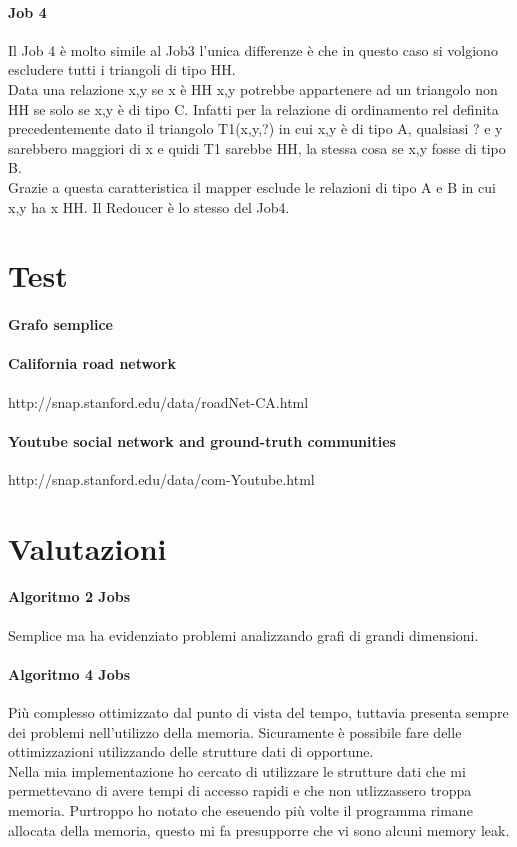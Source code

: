 \documentclass[paper=a4, fontsize=11pt]{scrartcl}	%
\numberwithin{equation}{section}															%
\numberwithin{figure}{section}																%
\numberwithin{table}{section}																%
\begin{document}
\paragraph{Job 4}
Il Job 4 è molto simile al Job3 l'unica differenze è che in questo caso si volgiono escludere tutti i triangoli di tipo HH.\\
Data una relazione x,y se x è HH x,y potrebbe appartenere ad un triangolo non HH se solo se x,y è di tipo C. Infatti per la relazione di ordinamento rel definita precedentemente dato il triangolo T1(x,y,?) in cui x,y è di tipo A, qualsiasi ? e y sarebbero maggiori di x e quidi T1 sarebbe HH, la stessa cosa se x,y fosse di tipo B.\\
Grazie a questa caratteristica il mapper esclude le relazioni di tipo A e B in cui x,y ha x HH.
Il Redoucer è lo stesso del Job4.
\section{Test}
\paragraph{Grafo semplice}
\paragraph{California road network}
http://snap.stanford.edu/data/roadNet-CA.html
\paragraph{Youtube social network and ground-truth communities}
http://snap.stanford.edu/data/com-Youtube.html


\section{Valutazioni}
\paragraph{Algoritmo 2 Jobs}
Semplice ma ha evidenziato problemi analizzando grafi di grandi dimensioni. 
\paragraph{Algoritmo 4 Jobs}
Più complesso ottimizzato dal punto di vista del tempo, tuttavia presenta sempre dei problemi nell'utilizzo della memoria. Sicuramente è possibile fare delle ottimizzazioni utilizzando delle strutture dati di opportune.\\ 
Nella mia implementazione ho cercato di utilizzare le strutture dati che mi permettevano di avere tempi di accesso rapidi e che non utlizzassero troppa memoria. Purtroppo ho notato che eseuendo più volte il programma rimane allocata della memoria, questo mi fa presupporre che vi sono alcuni memory leak.\\
\end{document}
